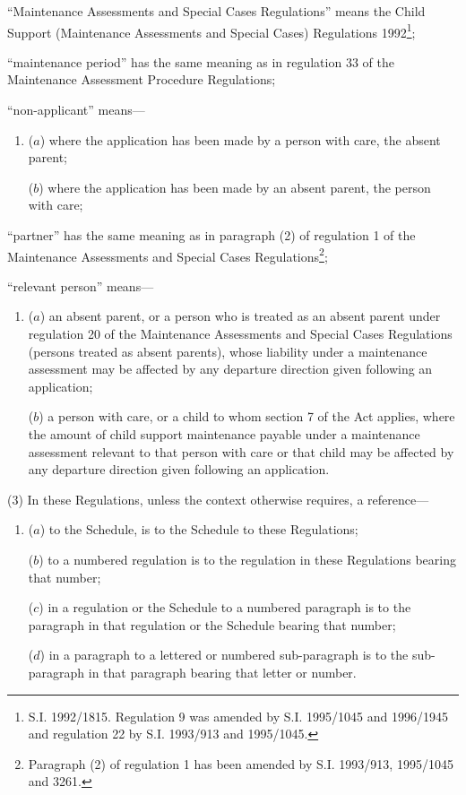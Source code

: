 \documentclass[a4paper]{article}
\begin{document}
\begin{enumerate}
“Maintenance Assessments and Special Cases Regulations” means the Child Support
(Maintenance Assessments and Special Cases) Regulations 1992\footnote{\frenchspacing S.I. 1992/1815. Regulation 9 was amended by S.I. 1995/1045 and 1996/1945 and regulation 22 by S.I. 1993/913 and 1995/1045.};

“maintenance period” has the same meaning as in regulation 33 of the Maintenance
Assessment Procedure Regulations;

“non-applicant” means—
\begin{enumerate}\item[]
($a$) where the application has been made by a person with care, the absent parent;

($b$) where the application has been made by an absent parent, the person with
care;
\end{enumerate}

“partner” has the same meaning as in paragraph (2) of regulation 1 of the
Maintenance Assessments and Special Cases Regulations\footnote{\frenchspacing Paragraph (2) of regulation 1 has been amended by S.I. 1993/913, 1995/1045 and 3261.};

“relevant person” means—
\begin{enumerate}\item[]
($a$) an absent parent, or a person who is treated as an absent parent under
regulation 20 of the Maintenance Assessments and Special Cases Regulations
(persons treated as absent parents), whose liability under a maintenance
assessment may be affected by any departure direction given following an
application;

($b$) a person with care, or a child to whom section 7 of the Act applies, where
the amount of child support maintenance payable under a maintenance assessment
relevant to that person with care or that child may be affected by any departure
direction given following an application.
\end{enumerate}
\end{enumerate}

(3) In these Regulations, unless the context otherwise requires, a reference—
\begin{enumerate}\item[]
($a$) to the Schedule, is to the Schedule to these Regulations;

($b$) to a numbered regulation is to the regulation in these Regulations bearing
that number;

($c$) in a regulation or the Schedule to a numbered paragraph is to the paragraph
in that regulation or the Schedule bearing that number;

($d$) in a paragraph to a lettered or numbered sub-paragraph is to the
sub-paragraph in that paragraph bearing that letter or number.
\end{enumerate}
\end{document}
